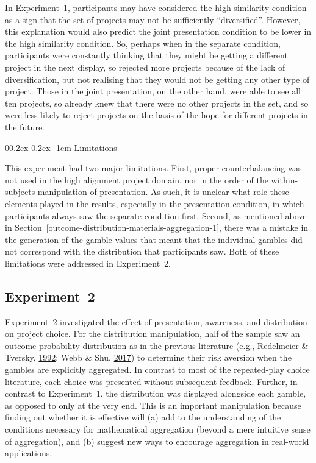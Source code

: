 \documentclass[
  english,
  man, donotrepeattitle,floatsintext]{apa7}
\makeatletter
\let\oldparagraph\paragraph
\renewcommand{\paragraph}[1]{\oldparagraph{#1}\mbox{}}
\renewcommand{\paragraph}{\@startsection{paragraph}{4}{\parindent}%
  {0\baselineskip \@plus 0.2ex \@minus 0.2ex}%
  {-1em}%
  {\normalfont\normalsize\bfseries\itshape\typesectitle}}
\theoremstyle{definition}
\theoremstyle{definition}
\theoremstyle{definition}
\theoremstyle{definition}
\theoremstyle{remark}
\makeatother
\begin{document}
In Experiment~1, participants may have considered the high similarity condition
as a sign that the set of projects may not be sufficiently ``diversified''.
However, this explanation would also predict the joint presentation condition to
be lower in the high similarity condition. So, perhaps when in the separate
condition, participants were constantly thinking that they might be getting a
different project in the next display, so rejected more projects because of the
lack of diversification, but not realising that they would not be getting any
other type of project. Those in the joint presentation, on the other hand, were
able to see all ten projects, so already knew that there were no other projects
in the set, and so were less likely to reject projects on the basis of the hope
for different projects in the future.

\hypertarget{limitations}{%
\paragraph{Limitations}\label{limitations}}

This experiment had two major limitations. First, proper counterbalancing was
not used in the high alignment project domain, nor in the order of the
within-subjects manipulation of presentation. As such, it is unclear what role
these elements played in the results, especially in the presentation condition,
in which participants always saw the separate condition first. Second, as
mentioned above in Section~\ref{outcome-distribution-materials-aggregation-1},
there was a mistake in the generation of the gamble values that meant that the
individual gambles did not correspond with the distribution that participants
saw. Both of these limitations were addressed in Experiment~2.

\hypertarget{aggregation-2}{%
\subsection{Experiment~2}\label{aggregation-2}}

Experiment~2 investigated the effect of presentation, awareness, and
distribution on project choice. For the distribution manipulation, half of the
sample saw an outcome probability distribution as in the previous literature
(e.g., Redelmeier \& Tversky, \protect\hyperlink{ref-redelmeier1992}{1992}; Webb \& Shu, \protect\hyperlink{ref-webb2017}{2017}) to determine their risk aversion when the
gambles are explicitly aggregated. In contrast to most of the repeated-play
choice literature, each choice was presented without subsequent feedback.
Further, in contrast to Experiment~1, the distribution was displayed alongside
each gamble, as opposed to only at the very end. This is an important
manipulation because finding out whether it is effective will (a) add to the
understanding of the conditions necessary for mathematical aggregation (beyond a
mere intuitive sense of aggregation), and (b) suggest new ways to encourage
aggregation in real-world applications.
\end{document}
